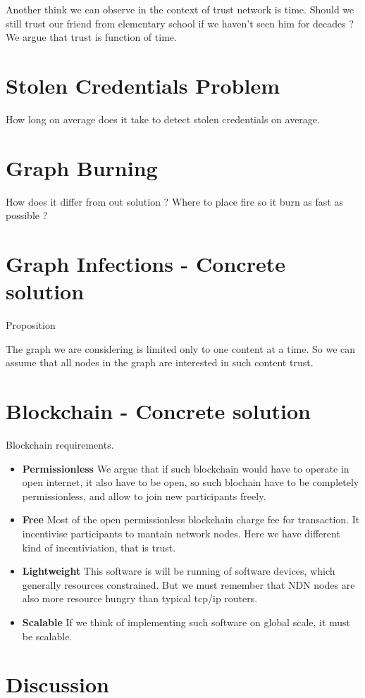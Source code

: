 \documentclass[runningheads]{llncs}
\begin{document}
Another think we can observe in the context of trust network is time. Should we still trust our friend from elementary school if we haven't seen him for decades ? We argue that trust is function of time.





\section{Stolen Credentials Problem}
How long on average does it take to detect stolen credentials on average.

\section{Graph Burning}
How does it differ from out solution ? Where to place fire so it burn as fast as possible ?


\section{Graph Infections - Concrete solution}
Proposition \cite{jekon2019content}

The graph we are considering is limited only to one content at a time. So we can assume that all nodes in the graph are interested in such content trust.

\section{Blockchain - Concrete solution}
Blockchain requirements.
\begin{itemize}
\item \textbf{Permissionless}
We argue that if such blockchain would have to operate in open internet, it also have to be open, so such blochain have to be completely permissionless, and allow to join new participants freely. 
\item \textbf{Free}
Most of the open permissionless blockchain charge fee for transaction. It incentivise participants to mantain network nodes.
Here we have different kind of incentiviation, that is trust. 
\item \textbf{Lightweight} This software is will be running of software devices, which generally resources constrained. But we must remember that NDN nodes are also more resource hungry than typical tcp/ip routers.
\item \textbf{Scalable} If we think of implementing such software on global scale, it must be scalable. 
\end{itemize}



\section{Discussion}

%
%
%



%
\end{document}

